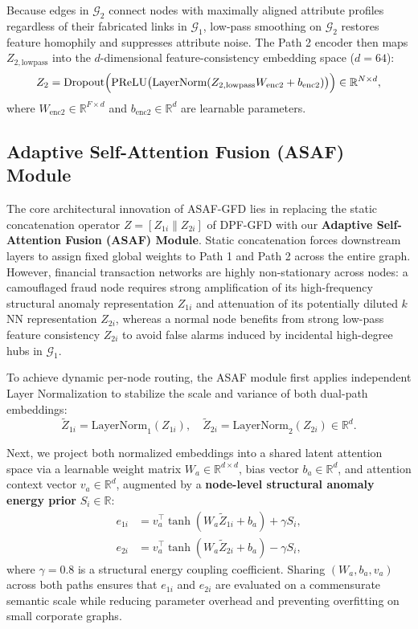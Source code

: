 \documentclass[10pt,a4paper,twocolumn]{article}
\begin{document}
Because edges in $\mathscr{G}_2$ connect nodes with maximally aligned attribute profiles regardless of their fabricated links in $\mathscr{G}_1$, low-pass smoothing on $\mathscr{G}_2$ restores feature homophily and suppresses attribute noise. The Path 2 encoder then maps $Z_{2,\text{lowpass}}$ into the $d$-dimensional feature-consistency embedding space ($d = 64$):
\begin{equation}
  \resizebox{0.89\linewidth}{!}{$\displaystyle Z_2 = \text{Dropout}\Big(\text{PReLU}\big(\text{LayerNorm}(Z_{2,\text{lowpass}} W_{\text{enc2}} + b_{\text{enc2}})\big)\Big) \in \mathbb{R}^{N \times d},$}
\end{equation}
where $W_{\text{enc2}} \in \mathbb{R}^{F \times d}$ and $b_{\text{enc2}} \in \mathbb{R}^d$ are learnable parameters.

\subsection{Adaptive Self-Attention Fusion (ASAF) Module}

The core architectural innovation of ASAF-GFD lies in replacing the static concatenation operator $Z = [Z_{1i} \parallel Z_{2i}]$ of DPF-GFD \cite{ref9} with our \textbf{Adaptive Self-Attention Fusion (ASAF) Module}. Static concatenation forces downstream layers to assign fixed global weights to Path 1 and Path 2 across the entire graph. However, financial transaction networks are highly non-stationary across nodes: a camouflaged fraud node requires strong amplification of its high-frequency structural anomaly representation $Z_{1i}$ and attenuation of its potentially diluted $k$NN representation $Z_{2i}$, whereas a normal node benefits from strong low-pass feature consistency $Z_{2i}$ to avoid false alarms induced by incidental high-degree hubs in $\mathscr{G}_1$.

To achieve dynamic per-node routing, the ASAF module first applies independent Layer Normalization \cite{ref55} to stabilize the scale and variance of both dual-path embeddings:
\begin{equation}
  \tilde{Z}_{1i} = \text{LayerNorm}_1(Z_{1i}), \quad \tilde{Z}_{2i} = \text{LayerNorm}_2(Z_{2i}) \in \mathbb{R}^d.
\end{equation}

Next, we project both normalized embeddings into a shared latent attention space via a learnable weight matrix $W_a \in \mathbb{R}^{d \times d}$, bias vector $b_a \in \mathbb{R}^d$, and attention context vector $v_a \in \mathbb{R}^d$, augmented by a \textbf{node-level structural anomaly energy prior} $S_i \in \mathbb{R}$:
\begin{align}
  e_{1i} &= v_a^\top \tanh(W_a \tilde{Z}_{1i} + b_a) + \gamma S_i, \\
  e_{2i} &= v_a^\top \tanh(W_a \tilde{Z}_{2i} + b_a) - \gamma S_i,
\end{align}
where $\gamma = 0.8$ is a structural energy coupling coefficient. Sharing $(W_a, b_a, v_a)$ across both paths ensures that $e_{1i}$ and $e_{2i}$ are evaluated on a commensurate semantic scale while reducing parameter overhead and preventing overfitting on small corporate graphs.
\end{document}
